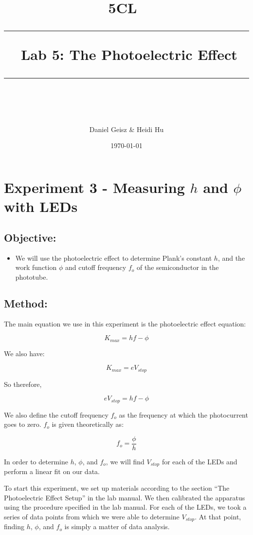 \documentclass[11pt]{article}
\title{	
	\normalfont\normalsize
	\textsc{ 5CL}\ %
	\vspace{25pt} %
	\rule{\linewidth}{0.5pt}\ %
	\vspace{20pt} %
	{\huge Lab 5: The Photoelectric Effect}\ %
	\vspace{12pt} %
	\rule{\linewidth}{2pt}\ %
	\vspace{12pt} %
}
\author{\LARGE Daniel Geisz \& Heidi Hu} %
\date{\normalsize\today}
\providecommand{\tightlist}{%
      \setlength{\itemsep}{0pt}\setlength{\parskip}{0pt}}
\begin{document}
    
    
    \maketitle
    
    

    
    \hypertarget{experiment-3---measuring-h-and-phi-with-leds}{%
\section{\texorpdfstring{Experiment 3 - Measuring \(h\) and \(\phi\)
with
LEDs}{Experiment 3 - Measuring h and \textbackslash phi with LEDs}}\label{experiment-3---measuring-h-and-phi-with-leds}}

\hypertarget{objective}{%
\subsection{Objective:}\label{objective}}

\begin{itemize}
\tightlist
\item
  We will use the photoelectric effect to determine Plank's constant
  \(h\), and the work function \(\phi\) and cutoff frequency \(f_o\) of
  the semiconductor in the phototube.
\end{itemize}

\hypertarget{method}{%
\subsection{Method:}\label{method}}

The main equation we use in this experiment is the photoelectric effect
equation:

\[K_{max} = hf - \phi\]

We also have:

\[K_{max} = eV_{stop}\]

So therefore,

\[eV_{stop} = hf - \phi\]

We also define the cutoff frequency \(f_o\) as the frequency at which
the photocurrent goes to zero. \(f_o\) is given theoretically as:

\[f_o = \frac{\phi}{h}\]

In order to determine \(h\), \(\phi\), and \(f_o\), we will find
\(V_{stop}\) for each of the LEDs and perform a linear fit on our data.

To start this experiment, we set up materials according to the section
``The Photoelectric Effect Setup'' in the lab manual. We then calibrated
the apparatus using the procedure specified in the lab manual. For each
of the LEDs, we took a series of data points from which we were able to
determine \(V_{stop}\). At that point, finding \(h\), \(\phi\), and
\(f_o\) is simply a matter of data analysis.
\end{document}
